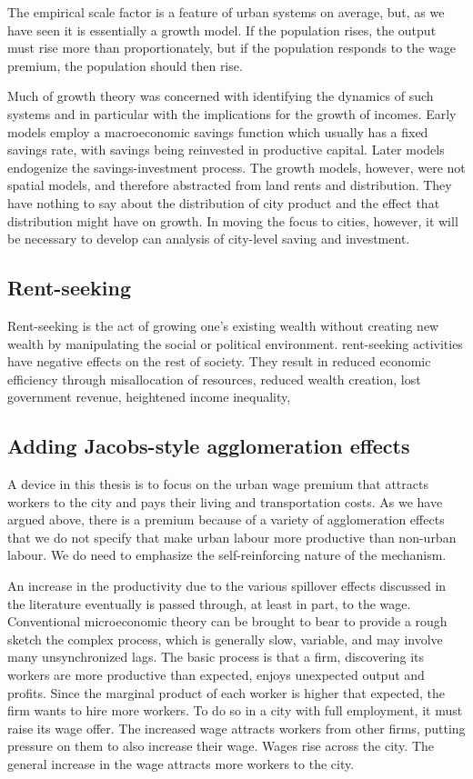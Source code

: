 The empirical scale factor is a feature of urban systems on average, but, as we have seen it is essentially a growth model. If the population rises, the output must rise more than proportionately, but if the population responds to the wage premium, the population should then rise. 

Much of growth theory was concerned with identifying the dynamics of such systems and in particular with the implications for the growth of incomes. Early models employ a macroeconomic savings function which usually has a fixed savings rate, with savings being reinvested in productive capital. Later models endogenize the savings-investment process. The growth models, however, were not spatial models, and therefore abstracted from land rents and distribution. They have nothing to say about the distribution of city product and the effect that distribution might have on growth. In moving the focus to cities, however, it will be necessary to develop can analysis of city-level saving and investment. 

\subsection{Rent-seeking}
  Rent-seeking is the act of growing one's existing wealth without creating new wealth by manipulating the social or political environment. \Gls{rent-seeking} activities have negative effects on the rest of society. They result in reduced economic efficiency through misallocation of resources, reduced wealth creation, lost government revenue, heightened income inequality,


\subsection{Adding Jacobs-style agglomeration effects}
A device in this thesis is to focus on the urban wage premium that attracts workers to the city and pays their living and transportation costs. As we have argued above, there is a premium because of a variety of agglomeration effects that we do not specify that make urban labour more productive than non-urban labour. %
We do need to emphasize the self-reinforcing nature of the mechanism.

An increase in the productivity due to the various spillover effects discussed in the literature eventually is passed through, at least in part, to the wage. Conventional microeconomic theory can be brought to bear to provide a rough sketch the  complex process, which is generally slow, variable, and may involve many unsynchronized lags.  The basic process is that a firm, discovering its workers are  more productive than expected, enjoys unexpected output and profits. Since the marginal product of each worker is higher that expected, the firm  wants to hire more workers. To do so in a city with full employment, it must raise its wage offer. The increased wage attracts workers from other firms, putting pressure on them to also increase their wage. Wages rise across the city. The general increase in the wage attracts more workers to the city. 

